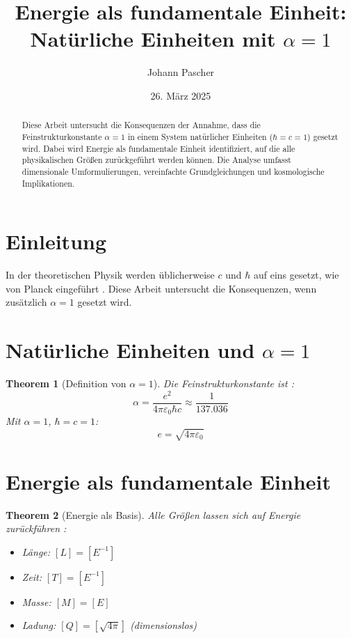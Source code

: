 \documentclass{article}
\title{Energie als fundamentale Einheit: \\ Natürliche Einheiten mit \(\alpha = 1\)}
\author{Johann Pascher}
\date{26. März 2025}
\newtheorem{theorem}{Theorem}[section]
\begin{document}
	
	\maketitle
	
	\begin{abstract}
		Diese Arbeit untersucht die Konsequenzen der Annahme, dass die Feinstrukturkonstante \(\alpha = 1\) in einem System natürlicher Einheiten (\(\hbar = c = 1\)) gesetzt wird. Dabei wird Energie als fundamentale Einheit identifiziert, auf die alle physikalischen Größen zurückgeführt werden können. Die Analyse umfasst dimensionale Umformulierungen, vereinfachte Grundgleichungen und kosmologische Implikationen.
	\end{abstract}
	
	\tableofcontents
	\newpage
	
	\section{Einleitung}
	In der theoretischen Physik werden üblicherweise \(c\) und \(\hbar\) auf eins gesetzt, wie von Planck eingeführt \cite{Planck1899}. Diese Arbeit untersucht die Konsequenzen, wenn zusätzlich \(\alpha = 1\) gesetzt wird.
	
	\section{Natürliche Einheiten und \(\alpha = 1\)}
	\begin{theorem}[Definition von \(\alpha = 1\)]
		Die Feinstrukturkonstante ist \cite{Feynman1985}:
		\begin{equation}
			\alpha = \frac{e^2}{4\pi\varepsilon_0 \hbar c} \approx \frac{1}{137.036}
		\end{equation}
		Mit \(\alpha = 1\), \(\hbar = c = 1\):
		\begin{equation}
			e = \sqrt{4\pi\varepsilon_0}
		\end{equation}
	\end{theorem}
	
	\section{Energie als fundamentale Einheit}
	\begin{theorem}[Energie als Basis]
		Alle Größen lassen sich auf Energie zurückführen \cite{Duff2002}:
		\begin{itemize}
			\item Länge: \([L] = [E^{-1}]\)
			\item Zeit: \([T] = [E^{-1}]\)
			\item Masse: \([M] = [E]\)
			\item Ladung: \([Q] = [\sqrt{4\pi}]\) (dimensionslos)
		\end{itemize}
	\end{theorem}
	
\end{document}
